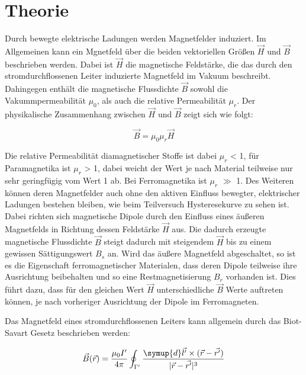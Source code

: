 \section{Theorie}
\label{sec:Theorie}


\cite{sample}


Durch bewegte elektrische Ladungen werden Magnetfelder induziert.
Im Allgemeinen kann ein Mgnetfeld über die beiden vektoriellen Größen 
$\vec H$ und $\vec B$ beschrieben werden. Dabei ist $\vec H$ die 
magnetische Feldstärke, die das durch den stromdurchflossenen Leiter induzierte 
Magnetfeld im Vakuum beschreibt. Dahingegen enthält die magnetische Flussdichte
$\vec B$ sowohl die Vakummpermeabilität $\mu_0$, als auch die relative Permeabilität
$\mu_r$. Der physikalische Zusammenhang zwischen $\vec H$ und $\vec B$ zeigt sich wie folgt:

\begin{equation}
    \vec B = \mu_0 \mu_r \vec H
\end{equation}

Die relative Permeabilität diamagnetischer Stoffe ist dabei $\mu_r$ < 1, für 
Paramagnetika ist $\mu_r$ > 1, dabei weicht der Wert je nach Material teilweise 
nur sehr geringfügig vom Wert 1 ab. Bei Ferromagnetika ist $\mu_r$ $\gg$ 1. Des Weiteren
können deren Magnetfelder auch ohne den aktiven Einfluss bewegter, elektrischer Ladungen
bestehen bleiben, wie beim Teilversuch Hysteresekurve zu sehen ist. Dabei richten sich 
magnetische Dipole durch den Einfluss 
eines äußeren Magnetfelds in Richtung dessen Feldstärke $\vec H$ aus. Die dadurch erzeugte magnetische
Flussdichte $\vec B$ steigt dadurch mit steigendem $\vec H$ bis zu einem gewissen Sättigungswert $B_s$
an. Wird das äußere Magnetfeld abgeschaltet, so ist es die Eigenschaft ferromagnetischer Materialen, dass
deren Dipole teilweise ihre Ausrichtung beibehalten und so eine Restmagnetisierung $B_r$ vorhanden ist.
Dies führt dazu, dass für den gleichen Wert $\vec H$ unterschiedliche $\vec B$ Werte auftreten können, je 
nach vorheriger Ausrichtung der Dipole im Ferromagneten. 


Das Magnetfeld eines stromdurchflossenen Leiters kann allgemein durch das Biot-Savart Gesetz
beschrieben werden:

\begin{equation}
    \vec{B}(\vec r) = \frac{\mu_0 I'}{4\pi} \oint_{\Gamma'} \frac{\symup{d}\vec{l'}\times (\vec{r}-\vec{r'})}{\lvert\vec{r}-\vec{r'}\rvert^3}
\end{equation}

